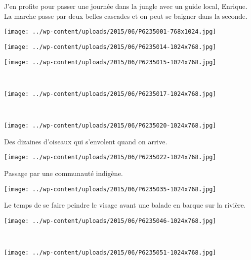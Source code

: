 J'en profite pour passer une journée dans la jungle avec un guide local, Enrique. La marche passe par deux belles cascades et on peut se baigner dans la seconde. 
\begin{center} 
\texttt{[image: ../wp-content/uploads/2015/06/P6235001-768x1024.jpg]} \end{center}
\begin{center} 
\texttt{[image: ../wp-content/uploads/2015/06/P6235014-1024x768.jpg]} 
\end{center} 
\vfill
\begin{center} 
\texttt{[image: ../wp-content/uploads/2015/06/P6235015-1024x768.jpg]} 
\end{center}
\vspace{-\topsep}
\vspace{-0.75mm}
\pagebreak
~
\begin{center} 
\texttt{[image: ../wp-content/uploads/2015/06/P6235017-1024x768.jpg]} 
\end{center}
~
\begin{center} 
\texttt{[image: ../wp-content/uploads/2015/06/P6235020-1024x768.jpg]} 
\end{center}
\vspace{-\topsep}
\pagebreak

Des dizaines d'oiseaux qui s'envolent quand on arrive. 
\begin{center} 
\texttt{[image: ../wp-content/uploads/2015/06/P6235022-1024x768.jpg]} 
\end{center}

Passage par une communauté indigène. 
\begin{center} 
\texttt{[image: ../wp-content/uploads/2015/06/P6235035-1024x768.jpg]} 
\end{center}
\vspace{-\topsep}
\pagebreak

Le temps de se faire peindre le visage avant une balade en barque sur la rivière. 
\begin{center} 
\texttt{[image: ../wp-content/uploads/2015/06/P6235046-1024x768.jpg]} 
\end{center}
~
\begin{center} 
\texttt{[image: ../wp-content/uploads/2015/06/P6235051-1024x768.jpg]} 
\end{center}
\vspace{-\topsep}
\pagebreak

